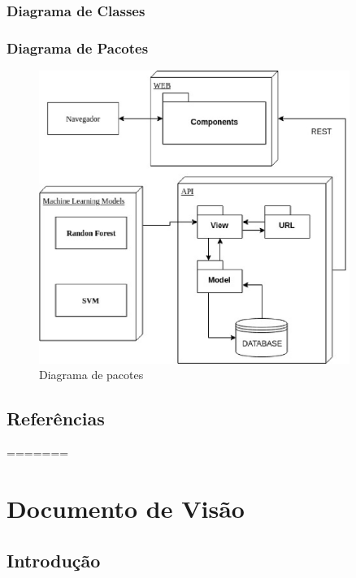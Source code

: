 \begin{anexosenv}
	\subsection{Diagrama de Classes}
	\subsection{Diagrama de Pacotes}
	\begin{figure}[!htb]
		\centering
		 \includegraphics[width=0.9\textwidth]{figuras/diagrama_pacotes.eps}
		 \caption{Diagrama de pacotes}
		 \label{diagramadepacotes}
	 \end{figure}

	\section{Referências}
=======

% 

\chapter[Documento de Visão]{Documento de Visão}

\section{Introdução}


\end{anexosenv}
